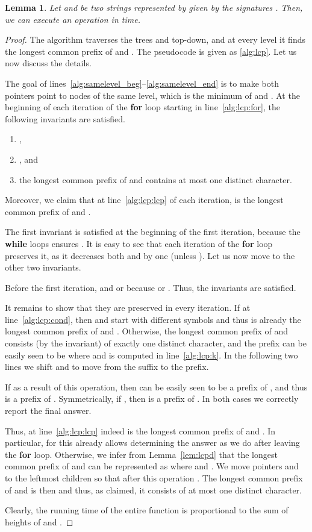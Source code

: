 \documentclass[a4paper]{article}
\newtheorem{lemma}[theorem]{Lemma}
\theoremstyle{remark}
\begin{document}
\begin{lemma}\label{lem:lcp}
  Let  and  be two strings represented by  given by the signatures .
Then, we can execute an  operation in  time.
\end{lemma}

\begin{proof}
The algorithm traverses the trees  and  top-down, and at every level  it finds the longest common prefix of  and .
The pseudocode is given as \cref{alg:lcp}.
Let us now discuss the details.

The goal of lines~\ref{alg:samelevel_beg}--\ref{alg:samelevel_end} is to make both pointers point to nodes of the same level,
which is the minimum of  and .
At the beginning of each iteration of the \textbf{for} loop starting in line~\ref{alg:lcp:for}, the following invariants are satisfied.
\begin{enumerate}
  \item ,
  \item , and
  \item the longest common prefix of  and  contains at most one distinct character.
\end{enumerate}
Moreover, we claim that at line~\ref{alg:lcp:lcp} of each iteration, 
is the longest common prefix of  and .



The first invariant is satisfied at the beginning of the first iteration, because the \textbf{while} loops ensures . It is easy to see that each iteration of the \textbf{for} loop preserves it, as it decreases both  and  by one (unless ).
Let us now move to the other two invariants.

Before the first iteration,  and  or 
because  or .
Thus, the invariants are satisfied.

It remains to show that they are preserved in every iteration.
If  at line~\ref{alg:lcp:cond}, then  and 
start with different symbols and thus  is already the longest
common prefix of  and .
Otherwise, the longest common prefix of  and  consists (by the invariant) of exactly
one distinct character, and the prefix can be easily seen to be 
where  and  is computed in line~\ref{alg:lcp:k}.
In the following two lines we shift  and  to move  from the suffix to the prefix.

If  as a result of this operation, then  can be easily seen to be a prefix of ,
and thus  is a prefix of .
Symmetrically, if , then  is a prefix of . In both cases we correctly report the final answer.

Thus, at line~\ref{alg:lcp:lcp}  indeed is the longest common prefix of  and .
In particular, for  this already allows determining the answer as we do after leaving the \textbf{for} loop.
Otherwise, we infer from Lemma~\ref{lem:lcpd} that the longest common prefix  of 
and  can be represented as  where 
and . We move pointers  and  to the leftmost children
so that after this operation . The longest
common prefix of  and  is then  and thus, as claimed, it
consists of at most one distinct character.

Clearly, the running time of the entire function is proportional to the sum of heights of  and .
\end{proof}
\end{document}
